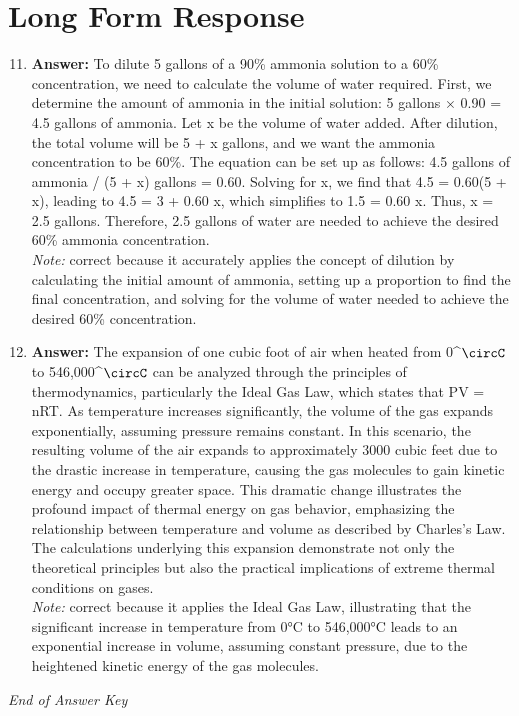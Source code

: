 \documentclass[12pt]{article}
\begin{document}
\section*{Long Form Response}
\begin{enumerate}[label=\arabic*.]
\setcounter{enumi}{10}
\item \textbf{Answer:} To dilute 5 gallons of a 90\% ammonia solution to a 60\% concentration, we need to calculate the volume of water required. First, we determine the amount of ammonia in the initial solution: 5 gallons \ensuremath{\times} 0.90 = 4.5 gallons of ammonia. Let x be the volume of water added. After dilution, the total volume will be 5 + x gallons, and we want the ammonia concentration to be 60\%. The equation can be set up as follows: 4.5 gallons of ammonia / (5 + x) gallons = 0.60. Solving for x, we find that 4.5 = 0.60(5 + x), leading to 4.5 = 3 + 0.60 x, which simplifies to 1.5 = 0.60 x. Thus, x = 2.5 gallons. Therefore, 2.5 gallons of water are needed to achieve the desired 60\% ammonia concentration.
\\ \textit{Note:} correct because it accurately applies the concept of dilution by calculating the initial amount of ammonia, setting up a proportion to find the final concentration, and solving for the volume of water needed to achieve the desired 60\% concentration.
\item \textbf{Answer:} The expansion of one cubic foot of air when heated from 0^\ensuremath{\circC} to 546,000^\ensuremath{\circC} can be analyzed through the principles of thermodynamics, particularly the Ideal Gas Law, which states that PV = nRT. As temperature increases significantly, the volume of the gas expands exponentially, assuming pressure remains constant. In this scenario, the resulting volume of the air expands to approximately 3000 cubic feet due to the drastic increase in temperature, causing the gas molecules to gain kinetic energy and occupy greater space. This dramatic change illustrates the profound impact of thermal energy on gas behavior, emphasizing the relationship between temperature and volume as described by Charles's Law. The calculations underlying this expansion demonstrate not only the theoretical principles but also the practical implications of extreme thermal conditions on gases.
\\ \textit{Note:} correct because it applies the Ideal Gas Law, illustrating that the significant increase in temperature from 0°C to 546,000°C leads to an exponential increase in volume, assuming constant pressure, due to the heightened kinetic energy of the gas molecules.
\end{enumerate}

\vfill
\noindent\textit{End of Answer Key}
\end{document}

